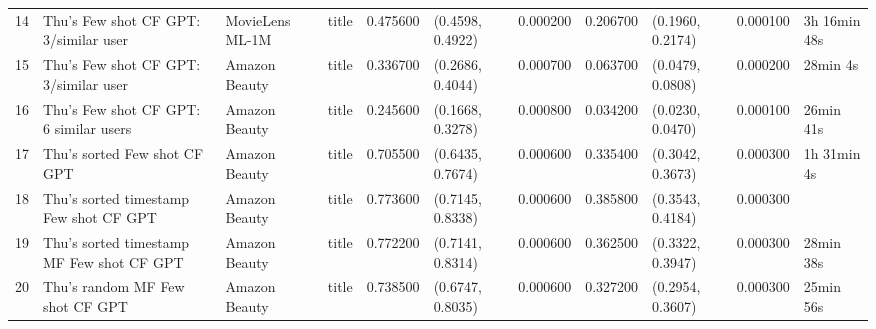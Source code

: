 \begin{tabular}{llllrllrlll}
14 & Thu's Few shot CF GPT: 3/similar user & MovieLens ML-1M & title & 0.475600 & (0.4598, 0.4922) & 0.000200 & 0.206700 & (0.1960, 0.2174) & 0.000100 & 3h 16min 48s \\
15 & Thu's Few shot CF GPT: 3/similar user & Amazon Beauty & title & 0.336700 & (0.2686, 0.4044) & 0.000700 & 0.063700 & (0.0479, 0.0808) & 0.000200 & 28min 4s \\
16 & Thu's Few shot CF GPT: 6 similar users & Amazon Beauty & title & 0.245600 & (0.1668, 0.3278) & 0.000800 & 0.034200 & (0.0230, 0.0470) & 0.000100 & 26min 41s \\
17 & Thu's sorted Few shot CF GPT & Amazon Beauty & title & 0.705500 & (0.6435, 0.7674) & 0.000600 & 0.335400 & (0.3042, 0.3673) & 0.000300 & 1h 31min 4s \\
18 & Thu's sorted timestamp Few shot CF GPT & Amazon Beauty & title & 0.773600 & (0.7145, 0.8338) & 0.000600 & 0.385800 & (0.3543, 0.4184) & 0.000300 &  \\
19 & Thu's sorted timestamp MF Few shot CF GPT & Amazon Beauty & title & 0.772200 & (0.7141, 0.8314) & 0.000600 & 0.362500 & (0.3322, 0.3947) & 0.000300 & 28min 38s \\
20 & Thu's random MF Few shot CF GPT & Amazon Beauty & title & 0.738500 & (0.6747, 0.8035) & 0.000600 & 0.327200 & (0.2954, 0.3607) & 0.000300 & 25min 56s \\
\end{tabular}
